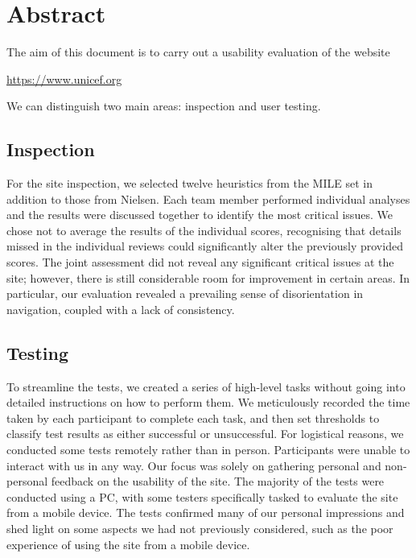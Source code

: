 \section{Abstract}
The aim of this document is to carry out a usability evaluation of the website
\begin{center}
    \url{https://www.unicef.org}
\end{center}
We can distinguish two main areas: inspection and user testing. 
\subsection{Inspection}
For the site inspection, we selected twelve heuristics from the MILE set in addition to those from Nielsen.
Each team member performed individual analyses and the results were discussed together to identify the most critical issues.
We chose not to average the results of the individual scores, recognising that details missed in the individual reviews could significantly alter the previously provided scores.
The joint assessment did not reveal any significant critical issues at the site; however, there is still considerable room for improvement in certain areas.
In particular, our evaluation revealed a prevailing sense of disorientation in navigation, coupled with a lack of consistency.

\subsection{Testing}
To streamline the tests, we created a series of high-level tasks without going into detailed instructions on how to perform them. 
We meticulously recorded the time taken by each participant to complete each task, and then set thresholds to classify test results as either successful or unsuccessful. 
For logistical reasons, we conducted some tests remotely rather than in person.
Participants were unable to interact with us in any way. Our focus was solely on gathering personal and non-personal feedback on the usability of the site.
The majority of the tests were conducted using a PC, with some testers specifically tasked to evaluate the site from a mobile device.
The tests confirmed many of our personal impressions and shed light on some aspects we had not previously considered, such as the poor experience of using the site from a mobile device.
